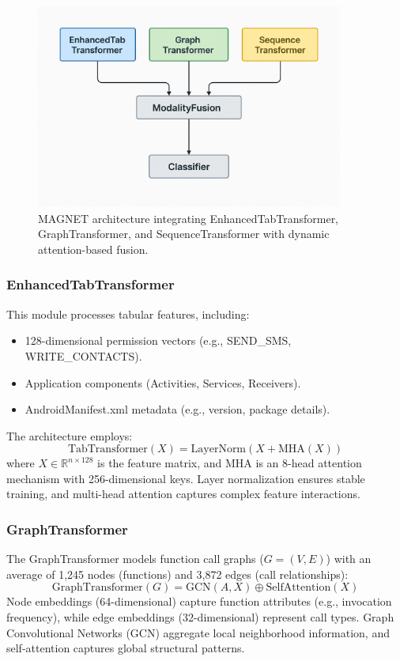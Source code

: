 \documentclass[10pt,conference]{IEEEtran}
\begin{document}
\begin{figure}[!t]
    \centering
    \includegraphics[width=0.9\textwidth]{figures/magnet_architecture.png}
    \caption{MAGNET architecture integrating EnhancedTabTransformer, GraphTransformer, and SequenceTransformer with dynamic attention-based fusion.}
    \label{fig:architecture}
\end{figure}

\subsubsection{EnhancedTabTransformer}
This module processes tabular features, including:
\begin{itemize}
    \item 128-dimensional permission vectors (e.g., SEND\_SMS, WRITE\_CONTACTS).
    \item Application components (Activities, Services, Receivers).
    \item AndroidManifest.xml metadata (e.g., version, package details).
\end{itemize}
The architecture employs:
\begin{equation}
\text{TabTransformer}(X) = \text{LayerNorm}(X + \text{MHA}(X))
\end{equation}
where $X \in \mathbb{R}^{n \times 128}$ is the feature matrix, and MHA is an 8-head attention mechanism with 256-dimensional keys. Layer normalization ensures stable training, and multi-head attention captures complex feature interactions.

\subsubsection{GraphTransformer}
The GraphTransformer models function call graphs ($G = (V, E)$) with an average of 1,245 nodes (functions) and 3,872 edges (call relationships):
\begin{equation}
\text{GraphTransformer}(G) = \text{GCN}(A, X) \oplus \text{SelfAttention}(X)
\end{equation}
Node embeddings (64-dimensional) capture function attributes (e.g., invocation frequency), while edge embeddings (32-dimensional) represent call types. Graph Convolutional Networks (GCN) aggregate local neighborhood information, and self-attention captures global structural patterns.
\end{document}
